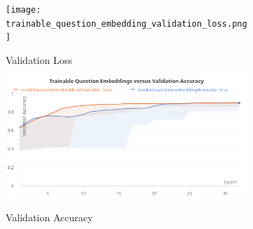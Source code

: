 \begin{figure}
    \centering
    \begin{subfigure}[l]{0.5\textwidth}
        \texttt{[image: trainable\_question\_embedding\_validation\_loss.png]}
        \label{fig:trainable_question_embedding_validation_loss}
        \caption{Validation Loss}
    \end{subfigure}
    \begin{subfigure}[r]{0.49\textwidth}
        \includegraphics[width=\textwidth]{figures/trainable_question_embedding_validation_accuracy.png}
        \label{fig:hyperparameter_optimisation_validation_accuracy}
        \caption{Validation Accuracy}
    \end{subfigure}
    \caption{}
    \label{fig:hyperparameter_optimisation_validation_loss_and_accuracy}
\end{figure}
 
 
